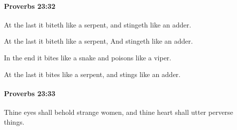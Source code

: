 		\paragraph{Proverbs 23:32} %
			\label{PROVERBS-23-32}

			At the last it biteth like a serpent, and stingeth like an adder.

			\begin{versebox}
					\item[BHS] 
					\item[ASV] At the last it biteth like a serpent, And stingeth like an adder.
					\item[NIV] In the end it bites like a snake and poisons like a viper.
					\item[NRSV] At the last it bites like a serpent, and stings like an adder.
			\end{versebox}

		\paragraph{Proverbs 23:33} %
			\label{PROVERBS-23-33}

			Thine eyes shall behold strange women, and thine heart shall utter perverse things.

